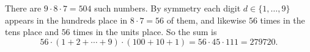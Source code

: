 There are $9\cdot8\cdot7=504$ such numbers. By symmetry each digit $d\in\{1,\dots,9\}$ appears in the hundreds place in $8\cdot7=56$ of them, and likewise $56$ times in the tens place and $56$ times in the units place. So the sum is
\[
56\cdot(1+2+\cdots+9)\cdot(100+10+1)=56\cdot45\cdot111=\boxed{279720}.
\]
